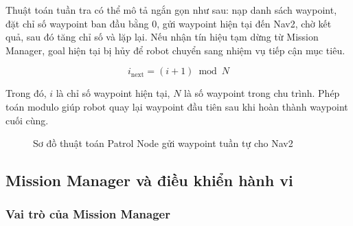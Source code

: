 Thuật toán tuần tra có thể mô tả ngắn gọn như sau: nạp danh sách waypoint, đặt chỉ số waypoint ban đầu bằng $0$, gửi waypoint hiện tại đến Nav2, chờ kết quả, sau đó tăng chỉ số và lặp lại. Nếu nhận tín hiệu tạm dừng từ Mission Manager, goal hiện tại bị hủy để robot chuyển sang nhiệm vụ tiếp cận mục tiêu.

\begin{equation}
    i_{\mathrm{next}} = (i+1)\bmod N
    \label{eq:next-waypoint-index}
\end{equation}

Trong đó, $i$ là chỉ số waypoint hiện tại, $N$ là số waypoint trong chu trình. Phép toán modulo giúp robot quay lại waypoint đầu tiên sau khi hoàn thành waypoint cuối cùng.

\begin{figure}[H]
\centering
{}
\caption{Sơ đồ thuật toán Patrol Node gửi waypoint tuần tự cho Nav2}
\label{fig:patrol-node-waypoints}
\end{figure}

\subsection{Mission Manager và điều khiển hành vi}
\label{subsec:mission-manager-behavior}

\subsubsection{Vai trò của Mission Manager}
\label{subsubsec:mission-manager-role}

